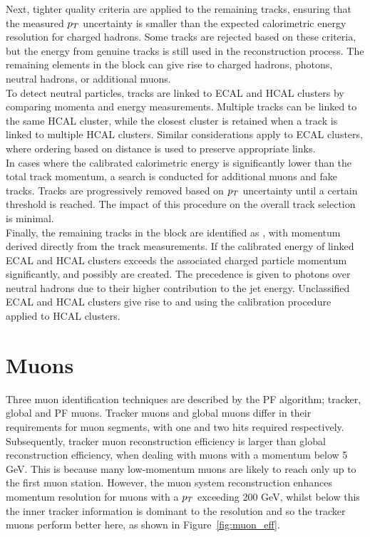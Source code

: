 Next, tighter quality criteria are applied to the remaining tracks, ensuring that the measured $p_{T}$ uncertainty is smaller than the expected calorimetric energy resolution for charged hadrons. 
Some tracks are rejected based on these criteria, but the energy from genuine tracks is still used in the reconstruction process. 
The remaining elements in the block can give rise to charged hadrons, photons, neutral hadrons, or additional muons. \\

To detect neutral particles, tracks are linked to \ac{ECAL} and \ac{HCAL} clusters by comparing momenta and energy measurements. 
Multiple tracks can be linked to the same \ac{HCAL} cluster, while the closest cluster is retained when a track is linked to multiple \ac{HCAL} clusters. 
Similar considerations apply to \ac{ECAL} clusters, where ordering based on distance is used to preserve appropriate links. \\

In cases where the calibrated calorimetric energy is significantly lower than the total track momentum, a search is conducted for additional muons and fake tracks. 
Tracks are progressively removed based on $p_{T}$ uncertainty until a certain threshold is reached. 
The impact of this procedure on the overall track selection is minimal. \\

Finally, the remaining tracks in the block are identified as , with momentum derived directly from the track measurements. 
If the calibrated energy of linked \ac{ECAL} and \ac{HCAL} clusters exceeds the associated charged particle momentum significantly,  and possibly  are created. 
The precedence is given to photons over neutral hadrons due to their higher contribution to the jet energy. 
Unclassified \ac{ECAL} and \ac{HCAL} clusters give rise to  and  using the calibration procedure applied to \ac{HCAL} clusters.

\section{Muons}

Three muon identification techniques are described by the \ac{PF} algorithm; tracker, global and \ac{PF} muons.
Tracker muons and global muons differ in their requirements for muon segments, with one and two hits required respectively. 
Subsequently, tracker muon reconstruction efficiency is larger than global reconstruction efficiency, when dealing with muons with a momentum below 5 GeV. 
This is because many low-momentum muons are likely to reach only up to the first muon station. 
However, the muon system reconstruction enhances momentum resolution for muons with a $p_{T}$ exceeding 200 GeV, whilst below this the inner tracker information is dominant to the resolution and so the tracker muons perform better here, as shown in Figure~\ref{fig:muon_eff}. \\

